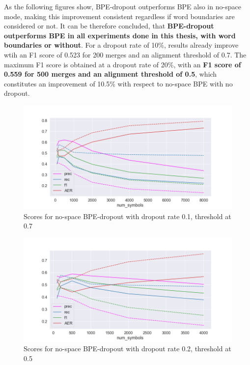 As the following figures show, BPE-dropout outperforms BPE also in no-space mode, making this improvement consistent regardless if word boundaries are considered or not. It can be therefore concluded, that \textbf{BPE-dropout outperforms BPE in all experiments done in this thesis, with word boundaries or without}. For a dropout rate of 10\%, results already improve wtih an F1 score of 0.523 for 200 merges and an alignment threshold of 0.7. The maximum F1 score is obtained at a dropout rate of 20\%, with an \textbf{F1 score of 0.559 for 500 merges and an alignment threshold of 0.5}, which constitutes an improvement of 10.5\% with respect to no-space BPE with no dropout.

\begin{figure}[!ht]
    \centering
    \includegraphics[width=13cm]{../reports/scores_dropout_bpe/no space/0.1/scores_ns_0.7_thres.png}
    \caption{Scores for no-space BPE-dropout with dropout rate 0.1, threshold at 0.7}
\end{figure}

\begin{figure}[!ht]
    \centering
    \includegraphics[width=13cm]{../reports/scores_dropout_bpe/no space/0.2/eng_deu_ns_0.5_thres.png}
    \caption{Scores for no-space BPE-dropout with dropout rate 0.2, threshold at 0.5}
\end{figure}

